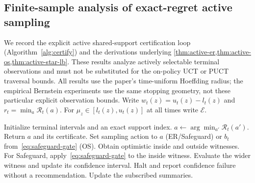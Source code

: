 \documentclass{article}
\theoremstyle{plain}
\theoremstyle{definition}
\begin{document}
\subsection{Finite-sample analysis of exact-regret active sampling}
\label{app:active-proofs}
We record the explicit active shared-support certification loop (Algorithm~\ref{alg:certify}) and the derivations underlying \cref{thm:active-er,thm:active-os,thm:active-star-lb}. These results analyze actively selectable terminal observations and must not be substituted for the on-policy UCT or PUCT traversal bounds. All results use the paper's time-uniform Hoeffding radius; the empirical Bernstein experiments use the same stopping geometry, not these particular explicit observation bounds. Write $w_t(z)=u_t(z)-l_t(z)$ and $r_t=\min_a\mathcal R_t(a)$. For $\mu_z\in[l_t(z),u_t(z)]$ at all times write $\mathcal E$.

\begin{algorithm}[!htbp]
\caption{Active shared-support certification}
\label{alg:certify}
\begin{algorithmic}[1]
\STATE Initialize terminal intervals and an exact support index.
\LOOP
\STATE $a\gets\arg\min_{a'}\mathcal R_t(a')$.
\STATE Return $a$ and its certificate.
\ENDIF
\STATE Set sampling action to $a$ (ER/Safeguard) or $b_t$ from~\eqref{eq:safeguard-gate} (OS).
\STATE Obtain optimistic inside and outside witnesses.
\STATE For Safeguard, apply~\eqref{eq:safeguard-gate} to the inside witness.
\STATE Evaluate the wider witness and update its confidence interval.
\STATE Halt and report confidence failure without a recommendation.
\ENDIF
\STATE Update the subscribed summaries.
\ENDLOOP
\end{algorithmic}
\end{algorithm}
\end{document}
